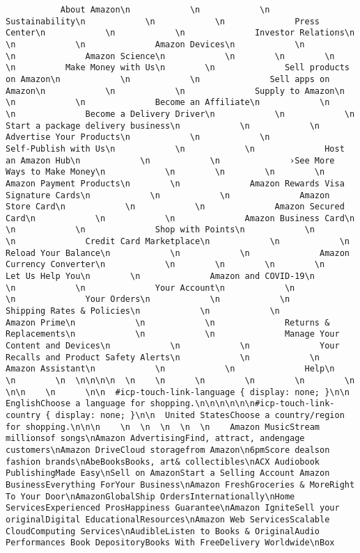 \documentclass[
]{article}
\begin{document}
\begin{verbatim}
           About Amazon\n            \n            \n              Sustainability\n            \n            \n              Press Center\n            \n            \n              Investor Relations\n            \n            \n              Amazon Devices\n            \n            \n              Amazon Science\n            \n        \n        \n        \n          Make Money with Us\n        \n              Sell products on Amazon\n            \n            \n              Sell apps on Amazon\n            \n            \n              Supply to Amazon\n            \n            \n              Become an Affiliate\n            \n            \n              Become a Delivery Driver\n            \n            \n              Start a package delivery business\n            \n            \n              Advertise Your Products\n            \n            \n              Self-Publish with Us\n            \n            \n              Host an Amazon Hub\n            \n            \n              ›See More Ways to Make Money\n            \n        \n        \n        \n          Amazon Payment Products\n        \n              Amazon Rewards Visa Signature Cards\n            \n            \n              Amazon Store Card\n            \n            \n              Amazon Secured Card\n            \n            \n              Amazon Business Card\n            \n            \n              Shop with Points\n            \n            \n              Credit Card Marketplace\n            \n            \n              Reload Your Balance\n            \n            \n              Amazon Currency Converter\n            \n        \n        \n        \n          Let Us Help You\n        \n              Amazon and COVID-19\n            \n            \n              Your Account\n            \n            \n              Your Orders\n            \n            \n              Shipping Rates & Policies\n            \n            \n              Amazon Prime\n            \n            \n              Returns & Replacements\n            \n            \n              Manage Your Content and Devices\n            \n            \n              Your Recalls and Product Safety Alerts\n            \n            \n              Amazon Assistant\n            \n            \n              Help\n            \n        \n  \n\n\n\n  \n    \n      \n        \n        \n        \n      \n\n    \n      \n\n  #icp-touch-link-language { display: none; }\n\n  EnglishChoose a language for shopping.\n\n\n\n\n\n#icp-touch-link-country { display: none; }\n\n  United StatesChoose a country/region for shopping.\n\n\n    \n  \n  \n  \n  \n    Amazon MusicStream millionsof songs\nAmazon AdvertisingFind, attract, andengage customers\nAmazon DriveCloud storagefrom Amazon\n6pmScore dealson fashion brands\nAbeBooksBooks, art& collectibles\nACX Audiobook PublishingMade Easy\nSell on AmazonStart a Selling Account Amazon BusinessEverything ForYour Business\nAmazon FreshGroceries & MoreRight To Your Door\nAmazonGlobalShip OrdersInternationally\nHome ServicesExperienced ProsHappiness Guarantee\nAmazon IgniteSell your originalDigital EducationalResources\nAmazon Web ServicesScalable CloudComputing Services\nAudibleListen to Books & OriginalAudio Performances Book DepositoryBooks With FreeDelivery Worldwide\nBox 
\end{verbatim}
\end{document}
